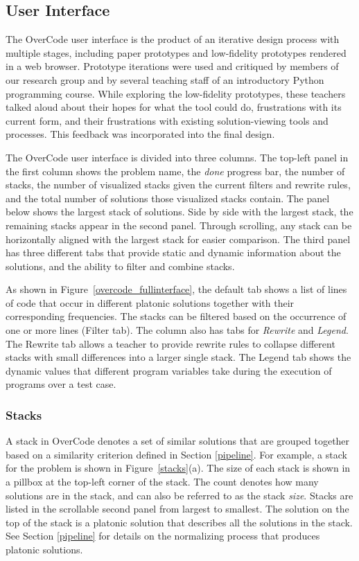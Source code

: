 \subsection{User Interface}

The OverCode user interface is the product of an iterative design process with multiple stages, including paper prototypes and low-fidelity prototypes rendered in a web browser.  Prototype iterations were used and critiqued by members of our research group and by several teaching staff of an introductory Python programming course. While exploring the low-fidelity prototypes, these teachers talked aloud about their hopes for what the tool could do, frustrations with its current form, and their frustrations with existing solution-viewing tools and processes. This feedback was incorporated into the final design.

The OverCode user interface is divided into three columns. The top-left panel in the first column shows the problem name, the \emph{done} progress bar, the number of stacks, the number of visualized stacks given the current filters and rewrite rules, and the total number of solutions those visualized stacks contain. The panel below shows the largest stack of solutions. Side by side with the largest stack, the remaining stacks appear in the second panel. Through scrolling, any stack can be horizontally aligned with the largest stack for easier comparison. The third panel has three different tabs that provide static and dynamic information about the solutions, and the ability to filter and combine stacks. 

As shown in Figure~\ref{overcode_fullinterface}, the default tab shows a list of lines of code that occur in different platonic solutions together with their corresponding frequencies. The stacks can be filtered based on the occurrence of one or more lines (Filter tab). The column also has tabs for \emph{Rewrite} and \emph{Legend}. The Rewrite tab allows a teacher to provide rewrite rules to collapse different stacks with small differences into a larger single stack. The Legend tab shows the dynamic values that different program variables take during the execution of programs over a test case. %


\subsubsection{Stacks} A stack in OverCode denotes a set of similar solutions that are grouped together based on a similarity criterion defined in Section \ref{pipeline}. For example, a stack for the  problem is shown in Figure~\ref{stacks}(a). The size of each stack is shown in a pillbox at the top-left corner of the stack. The count denotes how many solutions are in the stack, and can also be referred to as the stack {\it size}. Stacks are listed in the scrollable second panel from largest to smallest. The solution on the top of the stack is a platonic solution that describes all the solutions in the stack. See Section \ref{pipeline} for details on the normalizing process that produces platonic solutions.

